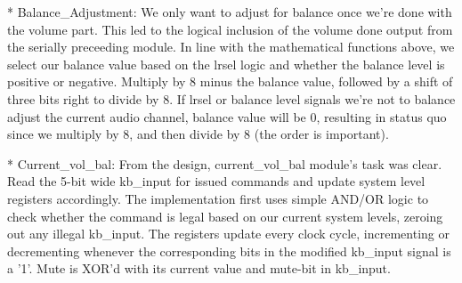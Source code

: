 	* Balance_Adjustment:
	We only want to adjust for balance once we're done with the volume part. This led to the logical inclusion of the volume done output from the serially preceeding module. In line with the mathematical functions above, we select our balance value based on the lrsel logic and whether the balance level is positive or negative. Multiply by 8 minus the balance value, followed by a shift of three bits right to divide by 8. If lrsel or balance level signals we're not to balance adjust the current audio channel, balance value will be 0, resulting in status quo since we multiply by 8, and then divide by 8 (the order is important).
	
	* Current_vol_bal:
	From the design, current_vol_bal module's task was clear. Read the 5-bit wide kb_input for issued commands and update system level registers accordingly. The implementation first uses simple AND/OR logic to check whether the command is legal based on our current system levels, zeroing out any illegal kb_input. The registers update every clock cycle, incrementing or decrementing whenever the corresponding bits in the modified kb_input signal is a '1'. Mute is XOR'd with its current value and mute-bit in kb_input.	
